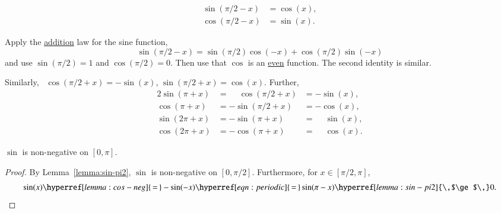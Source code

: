 \begin{lemma}[]\label{lemma:cos-sin}
\begin{align*}
\sin(\pi/2 - x)&=\cos(x),\\
\cos(\pi/2 - x)&=\sin(x).
\end{align*}
\end{lemma}

\begin{proved}
Apply the \hyperref[lemma:sin-add]{addition} law for the sine function,
\begin{displaymath}
\sin(\pi/2 - x) = \sin(\pi/2)\cos(-x) + \cos(\pi/2)\sin(-x)
\end{displaymath}
and use \hyperref[lemma:sin-pi2]{$\sin(\pi/2) = 1$} and
\hyperref[eqn:cospi2]{$\cos(\pi/2) = 0$}.  Then use that $\cos$ is an
\hyperref[lemma:cos-neg]{even} function.  The second identity is
similar.  \swallowed\end{proved}

Similarly,~%
$\cos(\pi/2 + x) =
-\sin(x)$, $\sin(\pi/2 + x) = \cos(x)$.  Further,
\begin{alignat}{2}
\label{eqn:periodic}
\sin(\pi + x) &= \phantom{-}\cos(\pi/2 + x) &= -\sin(x),\nonumber\\
\cos(\pi + x) &= -\sin(\pi/2 + x) &= -\cos(x),\nonumber\\
\sin(2\pi + x) &= -\sin(\pi + x) &= \phantom{-}\sin(x),\\
\cos(2\pi + x) &= -\cos(\pi + x) &= \phantom{-}\cos(x)\nonumber.
\end{alignat}
%
%
%

\begin{lemma}[]\label{lemma:sin-pos}
$\sin$ is non-negative on $[0,\pi]$.
\end{lemma}

\begin{proof} By Lemma~\ref{lemma:sin-pi2}, $\sin$ is non-negative on
  $[0,\pi/2]$.  Furthermore, for $x\in[\pi/2,\pi]$,
\begin{displaymath}
  \sin(x) \hyperref[lemma:cos-neg]{\,=\,} -\sin(-x) 
  \hyperref[eqn:periodic]{\,=\,}  \sin(\pi-x) \hyperref[lemma:sin-pi2]{\,$\ge$\,} 0.
\end{displaymath}
\end{proof}



